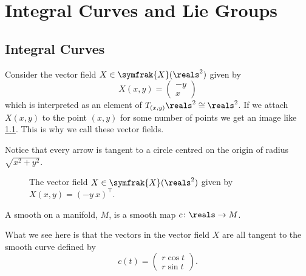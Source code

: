 \documentclass[fleqn]{NotesClass}
\newcommand{\isomorphic}{\cong}
\newcommand{\vectorFields}{\symfrak{X}}
\newcommand{\trans}{\top}
\begin{document}
    \chapter{Integral Curves and Lie Groups}
    \section{Integral Curves}

    Consider the vector field \(X \in \vectorFields(\reals^2)\) given by
    \begin{equation}
        X(x, y) = 
        \begin{pmatrix}
            -y\\ x
        \end{pmatrix}
    \end{equation}
    which is interpreted as an element of \(T_{(x, y)}\reals^2 \isomorphic \reals^2\).
    If we attach \(X(x, y)\) to the point \((x, y)\) for some number of points we get an image like \cref{fig:vector field example}.
    This is why we call these vector fields.
    
    Notice that every arrow is tangent to a circle centred on the origin of radius \(\sqrt{x^2 + y^2}\).
    
    \begin{figure}
        \caption[Example of a vector field]{The vector field \(X \in \vectorFields(\reals^2)\) given by \(X(x, y) = (-y\ x)^{\trans}\).}
        \label{fig:vector field example}
    \end{figure}
    
    \begin{dfn}{}{}
        A smooth  on a manifold, \(M\), is a smooth map \(c \colon \reals \to M\).
    \end{dfn}
    
    What we see here is that the vectors in the vector field \(X\) are all tangent to the smooth curve defined by
    \begin{equation}
        c(t) =
        \begin{pmatrix}
            r \cos t\\ r \sin t
        \end{pmatrix}
        .
    \end{equation}
    
\end{document}
